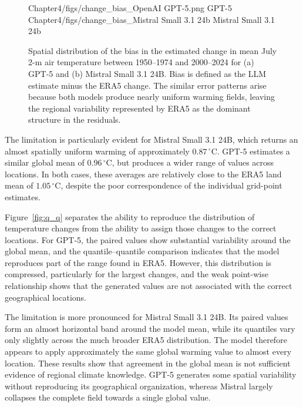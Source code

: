 \begin{figure}[H]
    \centering
    \mapmodel
        {Chapter4/figs/change_bias_OpenAI GPT-5.png}
        {GPT-5}
    \hfill
    \mapmodel
        {Chapter4/figs/change_bias_Mistral Small 3.1 24b}
        {Mistral Small 3.1 24b}
    \caption{
        Spatial distribution of the bias in the estimated change in mean July 2-m air temperature between 1950--1974 and 2000--2024 for (a) GPT-5 and (b) Mistral Small 3.1 24B. Bias is defined as the LLM estimate minus the ERA5 change. The similar error patterns arise because both models produce nearly uniform warming fields, leaving the regional variability represented by ERA5 as the dominant structure in the residuals.
        }    
    \label{fig:climate-change-bias}
\end{figure}

The limitation is particularly evident for Mistral Small 3.1 24B, which returns an almost spatially uniform warming of approximately \(0.87\,^{\circ}\mathrm{C}\). GPT-5 estimates a similar global mean of \(0.96\,^{\circ}\mathrm{C}\), but produces a wider range of values across locations. In both cases, these averages are relatively close to the ERA5 land mean of \(1.05\,^{\circ}\mathrm{C}\), despite the poor correspondence of the individual grid-point estimates.

Figure~\ref{fig:q_q} separates the ability to reproduce the distribution of temperature changes from the ability to assign those changes to the correct locations. For GPT-5, the paired values show substantial variability around the global mean, and the quantile--quantile comparison indicates that the model reproduces part of the range found in ERA5. However, this distribution is compressed, particularly for the largest changes, and the weak point-wise relationship shows that the generated values are not associated with the correct geographical locations.

The limitation is more pronounced for Mistral Small 3.1 24B. Its paired values form an almost horizontal band around the model mean, while its quantiles vary only slightly across the much broader ERA5 distribution. The model therefore appears to apply approximately the same global warming value to almost every location. These results show that agreement in the global mean is not sufficient evidence of regional climate knowledge. GPT-5 generates some spatial variability without reproducing its geographical organization, whereas Mistral largely collapses the complete field towards a single global value.

